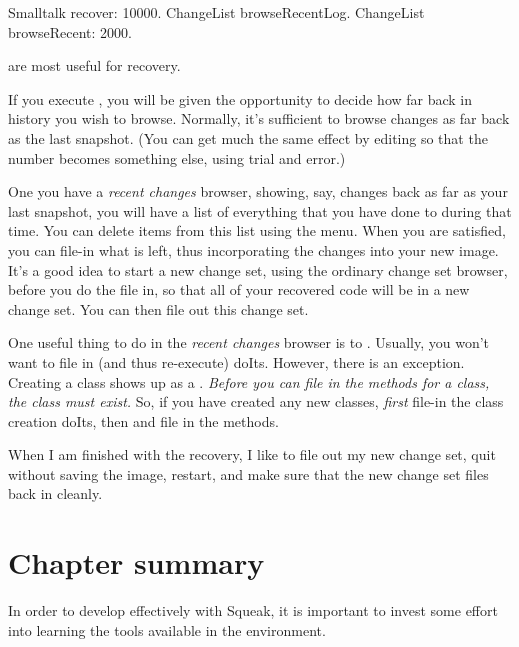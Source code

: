 \documentclass[a4paper,10pt,twoside]{book}
\begin{document}
\begin{code}{}
Smalltalk recover: 10000.
ChangeList browseRecentLog.
ChangeList browseRecent: 2000.
\end{code}

\noindent
are most useful for recovery.

If you execute , you will be given the opportunity to decide how far back in history you wish to browse. 
Normally, it's sufficient to browse changes as far back as the last snapshot. (You can get much the same effect by editing  so that the number  becomes something else, using trial and error.)

One you have a \emph{recent changes} browser, showing, say, changes back as far as your last snapshot, you will have a list of everything that you have done to \sq during that time. 
You can delete items from this list using the  menu.
When you are satisfied, you can file-in what is left, thus incorporating the changes into your new image.
It's a good idea to start a new change set, using the ordinary change set browser, before you do the file in, so that all of your recovered code will be in a new change set. 
You can then file out this change set.

One useful thing to do in the \emph{recent changes} browser is to . 
Usually, you won't want to file in (and thus re-execute) doIts. 
However, there is an exception. 
Creating a class shows up as a .
\emph{Before you can file in the methods for a class, the class must exist.}
So, if you have created any new classes, \emph{first} file-in the class creation doIts, then  and file in the methods.

When I am finished with the recovery, I like to file out my new change set, quit \sq without saving the image, restart, and make sure that the new change set files back in cleanly.

\section{Chapter summary}

In order to develop effectively with Squeak, it is important to invest some effort into learning the tools available in the environment.
\end{document}
